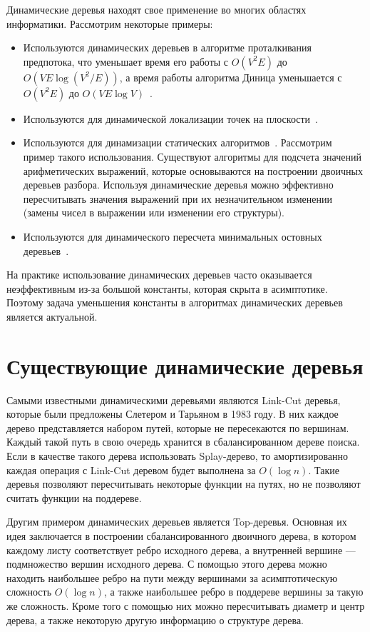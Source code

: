 Динамические деревья находят свое применение во многих областях информатики. Рассмотрим некоторые примеры:
\begin{itemize}
\item Используются динамических деревьев в алгоритме проталкивания предпотока, что уменьшает время его работы с 
$O(V^2 E)$ до $O(VE \log (V^2 / E))$, а время работы алгоритма Диница уменьшается с $O(V^2 E)$ до $O(VE \log V)$~\cite{tarj83}.
\item Используются для динамической локализации точек на плоскости~\cite{loca91}.
\item Используются для динамизации статических алгоритмов~\cite{acar05}. Рассмотрим пример такого использования. 
Существуют алгоритмы для подсчета значений арифметических выражений, которые основываются на построении двоичных деревьев разбора. 
Используя динамические деревья можно эффективно пересчитывать значения выражений при их незначительном изменении
(замены чисел в выражении или изменении его структуры).
\item Используются для динамического пересчета минимальных остовных деревьев~\cite{fred85}.
\end{itemize}

На практике использование динамических деревьев часто оказывается неэффективным из-за большой константы,
которая скрыта в асимптотике. Поэтому задача уменьшения константы в алгоритмах динамических деревьев является актуальной.
                                                                                                                                                                 
\FloatBarrier

\section{Существующие динамические деревья}

Самыми известными динамическими деревьями являются Link-Cut деревья, которые были предложены Слетером и Тарьяном в 1983 году. 
В них каждое дерево представляется набором путей, которые не пересекаются по вершинам. Каждый такой путь в свою очередь хранится в сбалансированном дереве поиска.
Если в качестве такого дерева использовать Splay-дерево, то амортизированно каждая операция с Link-Cut деревом будет выполнена за $O(\log n)$.
Такие деревья позволяют пересчитывать некоторые функции на путях, но не позволяют считать функции на поддереве.

Другим примером динамических деревьев является Top-деревья. Основная их идея заключается в построении сбалансированного двоичного дерева, в котором каждому листу соответствует ребро исходного дерева,
а внутренней вершине --- подмножество вершин исходного дерева.
С помощью этого дерева можно находить наибольшее ребро на пути между вершинами за асимптотическую сложность $O(\log n)$, а также наибольшее ребро в поддереве вершины за такую же сложность.
Кроме того с помощью них можно пересчитывать диаметр и центр дерева, а также некоторую другую информацию о структуре дерева.

